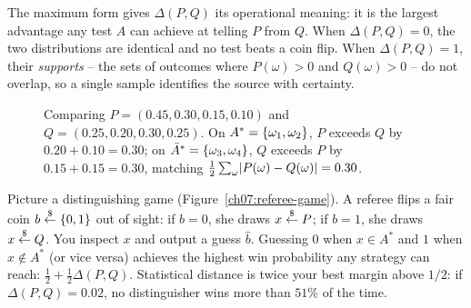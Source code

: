 The maximum form gives $\Delta(P, Q)$ its operational meaning: it is the largest advantage any test $A$ can achieve at telling $P$ from $Q$. When $\Delta(P, Q) = 0$, the two distributions are identical and no test beats a coin flip. When $\Delta(P, Q) = 1$, their \emph{supports} -- the sets of outcomes where $P(\omega) > 0$ and $Q(\omega) > 0$ -- do not overlap, so a single sample identifies the source with certainty.

\begin{figure}[htbp]
\centering
{}
\caption{Comparing $P = (0.45, 0.30, 0.15, 0.10)$ and $Q = (0.25, 0.20, 0.30, 0.25)$. On $A^* = \{\omega_1, \omega_2\}$, $P$ exceeds $Q$ by $0.20 + 0.10 = 0.30$; on $\bar A^* = \{\omega_3, \omega_4\}$, $Q$ exceeds $P$ by $0.15 + 0.15 = 0.30$, matching $\frac{1}{2}\sum_\omega \lvert P(\omega)-Q(\omega)\rvert = 0.30$.}
\label{fig:ch07-stat-dist-bars}
\end{figure}

\begin{intuitionbox}
Picture a distinguishing game (Figure~\ref{ch07:referee-game}). A referee flips a fair coin $b \stackrel{\$}{\gets} \{0,1\}$ out of sight: if $b = 0$, she draws $x \stackrel{\$}{\gets} P$; if $b = 1$, she draws $x \stackrel{\$}{\gets} Q$. You inspect $x$ and output a guess $\hat b$. Guessing $0$ when $x \in A^*$ and $1$ when $x \notin A^*$ (or vice versa) achieves the highest win probability any strategy can reach: $\frac{1}{2} + \frac{1}{2}\Delta(P, Q)$. Statistical distance is twice your best margin above $1/2$: if $\Delta(P, Q) = 0.02$, no distinguisher wins more than $51\%$ of the time.
\end{intuitionbox}

